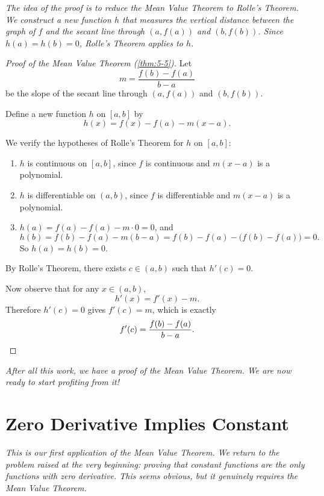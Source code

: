 \textit{The idea of the proof is to reduce the Mean Value Theorem to Rolle's Theorem.  We construct a new function $h$ that measures the vertical distance between the graph of $f$ and the secant line through $(a, f(a))$ and $(b, f(b))$.  Since $h(a) = h(b) = 0$, Rolle's Theorem applies to $h$.}

\begin{proof}[Proof of the Mean Value Theorem (\cref{thm:5-5})]
Let
\[
  m = \frac{f(b) - f(a)}{b - a}
\]
be the slope of the secant line through $(a, f(a))$ and $(b, f(b))$.

Define a new function $h$ on $[a,b]$ by
\[
  h(x) = f(x) - f(a) - m(x - a).
\]


We verify the hypotheses of Rolle's Theorem for $h$ on $[a,b]$:
\begin{enumerate}[label=(\roman*)]
  \item $h$ is continuous on $[a,b]$, since $f$ is continuous and $m(x - a)$ is a polynomial.
  \item $h$ is differentiable on $(a,b)$, since $f$ is differentiable and $m(x - a)$ is a polynomial.
  \item $h(a) = f(a) - f(a) - m \cdot 0 = 0$, and
  \[
    h(b) = f(b) - f(a) - m(b - a) = f(b) - f(a) - \bigl(f(b) - f(a)\bigr) = 0.
  \]
  So $h(a) = h(b) = 0$.
\end{enumerate}

By Rolle's Theorem, there exists $c \in (a,b)$ such that $h'(c) = 0$.

Now observe that for any $x \in (a,b)$,
\[
  h'(x) = f'(x) - m.
\]
Therefore $h'(c) = 0$ gives $f'(c) = m$, which is exactly
\[
  f'(c) = \frac{f(b) - f(a)}{b - a}. \qedhere
\]
\end{proof}

\textit{After all this work, we have a proof of the Mean Value Theorem.  We are now ready to start profiting from it!}

\section{Zero Derivative Implies Constant}
\label{sec:5.9}

\textit{This is our first application of the Mean Value Theorem.  We return to the problem raised at the very beginning: proving that constant functions are the only functions with zero derivative.  This seems obvious, but it genuinely requires the Mean Value Theorem.}

